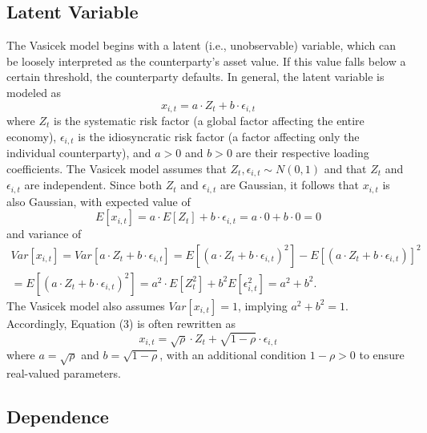 \documentclass[11pt,a4paper]{article}
\begin{document}
\subsection{Latent Variable}

The Vasicek model begins with a latent (i.e., unobservable) variable, which can be loosely interpreted as the counterparty’s asset value. If this value falls below a certain threshold, the counterparty defaults. In general, the latent variable is modeled as
\begin{equation}
x_{i,t} = a \cdot Z_t + b \cdot \epsilon_{i, t}
\end{equation}
where $Z_t$ is the systematic risk factor (a global factor affecting the entire economy), $\epsilon_{i, t}$ is the idiosyncratic risk factor (a factor affecting only the individual counterparty), and $a > 0$ and $b > 0$ are their respective loading coefficients. The Vasicek model assumes that $Z_t, \epsilon_{i, t} \sim N(0, 1)$ and that $Z_t$ and $\epsilon_{i, t}$ are independent. Since both $Z_t$ and $\epsilon_{i, t}$ are Gaussian, it follows that $x_{i, t}$ is also Gaussian, with expected value of
\begin{equation}
E[x_{i, t}] = a \cdot E[Z_t] + b \cdot \epsilon_{i, t} = a \cdot 0 + b \cdot 0 = 0
\end{equation}
and variance of
\begin{multline}
Var[x_{i, t}] = Var[a \cdot Z_t + b \cdot \epsilon_{i, t}] = E[(a \cdot Z_t + b \cdot \epsilon_{i, t})^2] - E[(a \cdot Z_t + b \cdot \epsilon_{i, t})]^2\\ = E[(a \cdot Z_t + b \cdot \epsilon_{i, t})^2] = a^2 \cdot E[Z_t^2] + b^2 E[\epsilon_{i, t}^2] = a^2 + b^2.
\end{multline}
The Vasicek model also assumes $Var[x_{i, t}] = 1$, implying $a^2 + b^2 = 1$. Accordingly, Equation (3) is often rewritten as
\begin{equation}
x_{i ,t} = \sqrt{\rho} \cdot Z_t + \sqrt{1 - \rho} \cdot \epsilon_{i, t}
\end{equation}
where $a = \sqrt{\rho}$ and $b = \sqrt{1 - \rho}$, with an additional condition $1 - \rho > 0$ to ensure real-valued parameters.

\subsection{Dependence}
\end{document}
